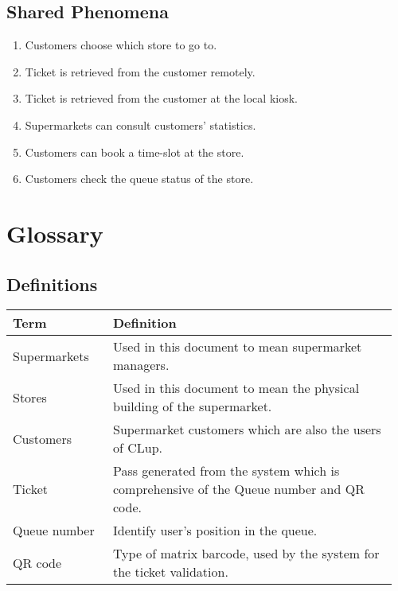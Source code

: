 \subsection{Shared Phenomena}
\begin{enumerate}[label=\textbf{SP.\arabic*}]
	\item Customers choose which store to go to.
	\item Ticket is retrieved from the customer remotely.
	\item Ticket is retrieved from the customer at the local kiosk.
	\item Supermarkets can consult customers' statistics.
	\item Customers can book a time-slot at the store.
	\item Customers check the queue status of the store.
\end{enumerate}

\section{Glossary}
\subsection{Definitions}
\begin{center}
	\begin{tabular}{@{}p{0.25\linewidth} p{0.71\linewidth}@{}}
		\toprule
		\textbf{Term} & \textbf{Definition}\\
		\midrule
		Supermarkets & Used in this document to mean supermarket managers.\\
		Stores & Used in this document to mean the physical building of the supermarket.\\
		Customers & Supermarket customers which are also the users of CLup.\\
		Ticket & Pass generated from the system which is comprehensive of the Queue number and QR code.\\
		Queue number & Identify user's position in the queue.\\
		QR code & Type of matrix barcode, used by the system for the ticket validation.\\

		\bottomrule
	\end{tabular}
\end{center}

